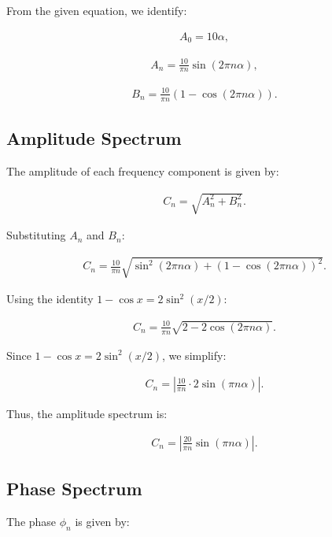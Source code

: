 \documentclass[12pt,a4paper]{report}
\begin{document}
From the given equation, we identify:

\begin{align}
A_0 = 10\alpha,
\end{align}

\begin{align}
A_n = \frac{10}{\pi n} \sin(2\pi n \alpha),
\end{align}

\begin{align}
B_n = \frac{10}{\pi n} (1 - \cos(2\pi n \alpha)).
\end{align}

\subsection{Amplitude Spectrum}

The amplitude of each frequency component is given by:

\begin{align}
C_n = \sqrt{A_n^2 + B_n^2}.
\end{align}

Substituting $ A_n $ and $ B_n $:

\begin{align}
C_n = \frac{10}{\pi n} \sqrt{\sin^2(2\pi n \alpha) + (1 - \cos(2\pi n \alpha))^2}.
\end{align}

Using the identity $ 1 - \cos x = 2 \sin^2(x/2) $:

\begin{align}
C_n = \frac{10}{\pi n} \sqrt{2 - 2\cos(2\pi n \alpha)}.
\end{align}

Since $ 1 - \cos x = 2 \sin^2(x/2) $, we simplify:

\begin{align}
C_n = \left|{{\frac{10}{\pi n} \cdot 2 \sin \left( \pi n \alpha \right)}}\right|.
\end{align}

Thus, the amplitude spectrum is:

\begin{align}
C_n = \left|{\frac{20}{\pi n} \sin(\pi n \alpha)}\right|.
\end{align}

\subsection{Phase Spectrum}

The phase $ \phi_n $ is given by:
\end{document}
